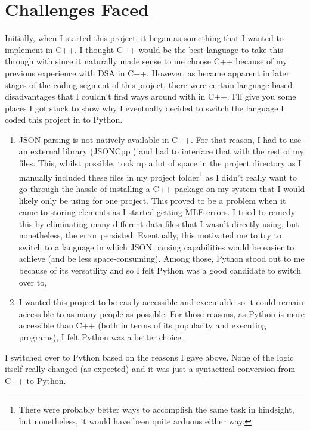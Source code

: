 
\section{Challenges Faced}
Initially, when I started this project, it began as something that I wanted to implement in C++. I thought C++ would be the best language to take this through with since it naturally made sense to me choose C++ because of my previous experience with DSA in C++. However, as became apparent in later stages of the coding segment of this project, there were certain language-based disadvantages that I couldn't find ways around with in C++. I'll give you some places I got stuck to show why I eventually decided to switch the language I coded this project in to Python. 

\begin{enumerate}
  \item JSON parsing is not natively available in C++. For that reason, I had to use an external library (JSONCpp \cite{jsoncpp}) and had to interface that with the rest of my files. This, whilst possible, took up a lot of space in the project directory as I manually included these files in my project folder\footnote{There were probably better ways to accomplish the same task in hindsight, but nonetheless, it would have been quite arduous either way.} as I didn't really want to go through the hassle of installing  a C++ package on my system that I would likely only be using for one project. This proved to be a problem when it came to storing elements as I started getting MLE errors. I tried to remedy this by eliminating many different data files that I wasn't directly using, but nonetheless, the error persisted. Eventually, this motivated me to try to switch to a language in which JSON parsing capabilities would be easier to achieve (and be less space-consuming). Among those, Python stood out to me because of its versatility and so I felt Python was a good candidate to switch over to,
  \item I wanted this project to be easily accessible and executable so it could remain accessible to as many people as possible. For those reasons, as Python is more accessible than C++ (both in terms of its popularity and executing programs), I felt Python was a better choice. 
\end{enumerate}

I switched over to Python based on the reasons I gave above. None of the logic itself really changed (as expected) and it was just a syntactical conversion from C++ to Python.